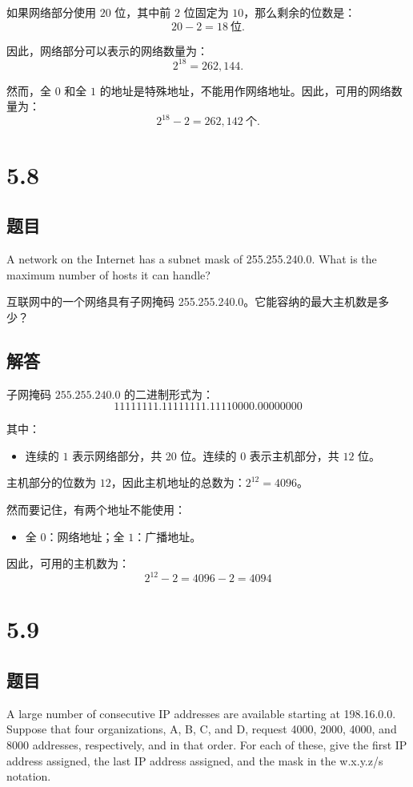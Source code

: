 如果网络部分使用 \( 20 \) 位，其中前 \( 2 \) 位固定为 \( 10 \)，那么剩余的位数是：
\[
20 - 2 = 18 \ \text{位}.
\]

因此，网络部分可以表示的网络数量为：
\[
2^{18} = 262,144.
\]

然而，全 \( 0 \) 和全 \( 1 \) 的地址是特殊地址，不能用作网络地址。因此，可用的网络数量为：
\[
2^{18} - 2 = 262,142 \ \text{个}.
\]

\section{5.8}

\subsection*{题目}
A network on the Internet has a subnet mask of 255.255.240.0. What is the maximum number of hosts it can handle?

互联网中的一个网络具有子网掩码 255.255.240.0。它能容纳的最大主机数是多少？

\subsection*{解答}

子网掩码 \( 255.255.240.0 \) 的二进制形式为：
\[
11111111.11111111.11110000.00000000
\]

\noindent 其中：
\begin{itemize}
    \item 连续的 \( 1 \) 表示网络部分，共 \( 20 \) 位。连续的 \( 0 \) 表示主机部分，共 \( 12 \) 位。
\end{itemize}

主机部分的位数为 \( 12 \)，因此主机地址的总数为：$2^{12} = 4096$。

然而要记住，有两个地址不能使用：
\begin{itemize}
    \item 全 \( 0 \)：网络地址；全 \( 1 \)：广播地址。
\end{itemize}

因此，可用的主机数为：
\[
2^{12} - 2 = 4096 - 2 = 4094
\]

\section{5.9}

\subsection*{题目}
A large number of consecutive IP addresses are available starting at 198.16.0.0. Suppose that four organizations, A, B, C, and D, request 4000, 2000, 4000, and 8000 addresses, respectively, and in that order. For each of these, give the first IP address assigned, the last IP address assigned, and the mask in the w.x.y.z/s notation.

